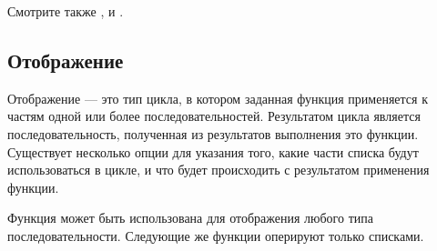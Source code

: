 Смотрите также ,  и
.

\subsection{Отображение}

Отображение --- это тип цикла, в котором заданная функция применяется к частям
одной или более последовательностей. Результатом цикла является
последовательность, полученная из результатов выполнения это функции.
Существует несколько опции для указания того, какие части списка будут
использоваться в цикле, и что будет происходить с результатом применения
функции.

Функция  может быть использована для отображения любого типа
последовательности.
Следующие же функции оперируют только списками.


